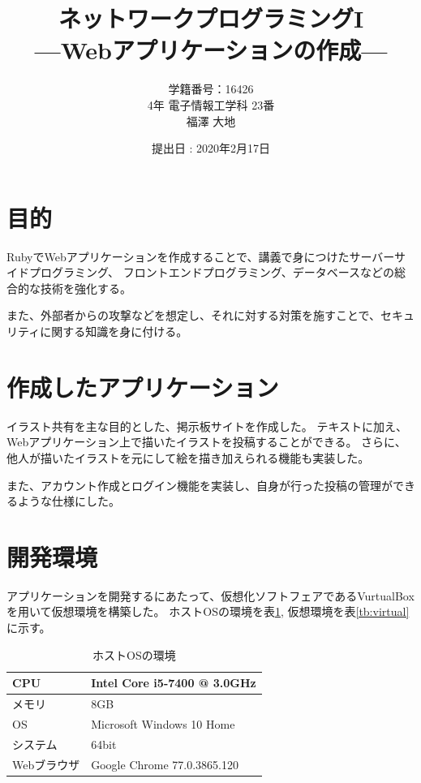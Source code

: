 \documentclass[a4j,titlepage]{jsarticle}
\begin{document}
\begin{titlepage}
  \title{\huge{ネットワークプログラミングI} \\ \LARGE{---Webアプリケーションの作成---}}
	\author{学籍番号：16426 \\ 4年 電子情報工学科 23番 \\ 福澤 大地}
	\date{提出日 : 2020年2月17日}
  \maketitle
\end{titlepage}


\section{目的}
RubyでWebアプリケーションを作成することで、講義で身につけたサーバーサイドプログラミング、
フロントエンドプログラミング、データベースなどの総合的な技術を強化する。

また、外部者からの攻撃などを想定し、それに対する対策を施すことで、セキュリティに関する知識を身に付ける。


\section{作成したアプリケーション}
イラスト共有を主な目的とした、掲示板サイトを作成した。
テキストに加え、Webアプリケーション上で描いたイラストを投稿することができる。
さらに、他人が描いたイラストを元にして絵を描き加えられる機能も実装した。

また、アカウント作成とログイン機能を実装し、自身が行った投稿の管理ができるような仕様にした。


\section{開発環境}
アプリケーションを開発するにあたって、仮想化ソフトフェアであるVurtualBoxを用いて仮想環境を構築した。
ホストOSの環境を表\ref{tb:kan}, 仮想環境を表\ref{tb:virtual}に示す。

\begin{table}[H]
  \centering
  \caption{ホストOSの環境}
  \label{tb:kan}

  \begin{tabular}{|l|l|}
    \hline
    CPU & Intel Core i5-7400 @ 3.0GHz \\ \hline
    メモリ & 8GB \\ \hline
    OS & Microsoft Windows 10 Home \\ \hline
    システム & 64bit \\ \hline
    Webブラウザ & Google Chrome 77.0.3865.120 \\ \hline
  \end{tabular}
\end{table}
\end{document}
